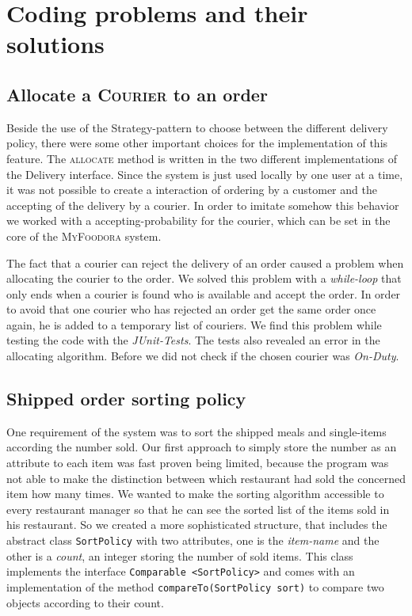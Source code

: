 \section{Coding problems and their solutions}
\label{sec:coding_problems_and_their_solutions}

\subsection{Allocate a \textsc{Courier} to an order}
\label{sub:allocate_a_courier_to_an_order}

Beside the use of the Strategy-pattern to choose between the different delivery policy, there were
some other important choices for the implementation of this feature. The \textsc{allocate} method 
is written in the two different implementations of the Delivery interface. Since the system is 
just used locally by one user at a time, it was not possible to create a interaction of ordering
by a customer and the accepting of the delivery by a courier. In order to imitate somehow this 
behavior we worked with a accepting-probability for the courier, which can be set in the core of
the \textsc{MyFoodora} system. 

The fact that a courier can reject the delivery of an order caused a problem when allocating the 
courier to the order. We solved this problem with a \textit{while-loop} that only ends when
a courier is found who is available and accept the order. In order to avoid that one courier who
has rejected an order get the same order once again, he is added to a temporary list of
couriers. We find this problem while testing the code with the \textit{JUnit-Tests}. The tests 
also revealed an error in the allocating algorithm. Before we did not check if the chosen 
courier was \textit{On-Duty}.

 

\subsection{Shipped order sorting policy}
\label{sub:shipped_order_sorting_policy}

One requirement of the system was to sort the shipped meals and single-items according the 
number sold. Our first approach to simply store the number as an attribute to each item
was fast proven being limited, because the program was not able to make the distinction
between which restaurant had sold the concerned item how many times. We wanted to 
make the sorting algorithm accessible to every restaurant manager so that he can see  the 
sorted list of the items sold in his restaurant. So we created a more sophisticated 
structure, that includes the abstract class \lstinline|SortPolicy| with two attributes,
one is the \textit{item-name} and the other is a \textit{count}, an integer storing the number
of sold items.
This class implements the interface \lstinline|Comparable <SortPolicy>| and comes with 
an implementation of the method \lstinline|compareTo(SortPolicy sort)| to compare two
objects according to their count.

